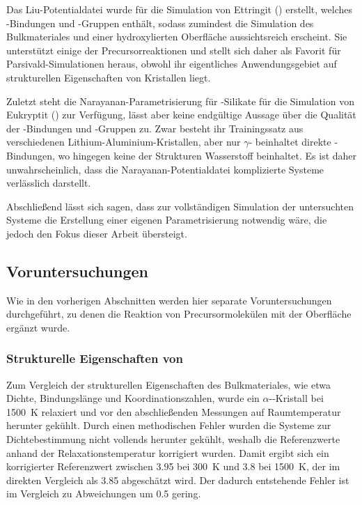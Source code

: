 Das Liu-Potentialdatei wurde für die Simulation von Ettringit () erstellt, welches -Bindungen und -Gruppen enthält, sodass zumindest die Simulation des Bulkmateriales und einer hydroxylierten Oberfläche aussichtsreich erscheint.
Sie unterstützt einige der Precursorreaktionen und stellt sich daher als Favorit für Parsivald-Simulationen heraus, obwohl ihr eigentliches Anwendungsgebiet auf strukturellen Eigenschaften von Kristallen liegt.

Zuletzt steht die Narayanan-Parametrisierung für -Silikate für die Simulation von Eukryptit () zur Verfügung, lässt aber keine endgültige Aussage über die Qualität der -Bindungen und -Gruppen zu.
Zwar besteht ihr Trainingssatz aus verschiedenen Lithium-Aluminium-Kristallen, aber nur $\gamma$- beinhaltet direkte -Bindungen, wo hingegen keine der Strukturen Wasserstoff beinhaltet.
Es ist daher unwahrscheinlich, dass die Narayanan-Potentialdatei komplizierte Systeme verlässlich darstellt.

Abschließend lässt sich sagen, dass zur vollständigen Simulation der untersuchten Systeme die Erstellung einer eigenen Parametrisierung notwendig wäre, die jedoch den Fokus dieser Arbeit übersteigt.

\subsection{Voruntersuchungen}

Wie in den vorherigen Abschnitten werden hier separate Voruntersuchungen durchgeführt, zu denen die Reaktion von Precursormolekülen mit der Oberfläche ergänzt wurde.

\subsubsection{Strukturelle Eigenschaften von }

Zum Vergleich der strukturellen Eigenschaften des Bulkmateriales, wie etwa Dichte, Bindungslänge und Koordinationszahlen, wurde ein $\alpha$--Kristall bei \SI{1500}{\kelvin} relaxiert und vor den abschließenden Messungen auf Raumtemperatur herunter gekühlt.
Durch einen methodischen Fehler wurden die Systeme zur Dichtebestimmung nicht vollends herunter gekühlt, weshalb die Referenzwerte anhand der Relaxationstemperatur korrigiert wurden.
Damit ergibt sich ein korrigierter Referenzwert zwischen \SI{3.95}{\gpcc} bei \SI{300}{\kelvin} und \SI{3.8}{\gpcc} bei \SI{1500}{\kelvin}\cite{fiquet_high-temperature_1999}, der im direkten Vergleich als \SI{3.85}{\gpcc} abgeschätzt wird.
Der dadurch entstehende Fehler ist im Vergleich zu Abweichungen um \SI{0.5}{\gpcc} gering.

